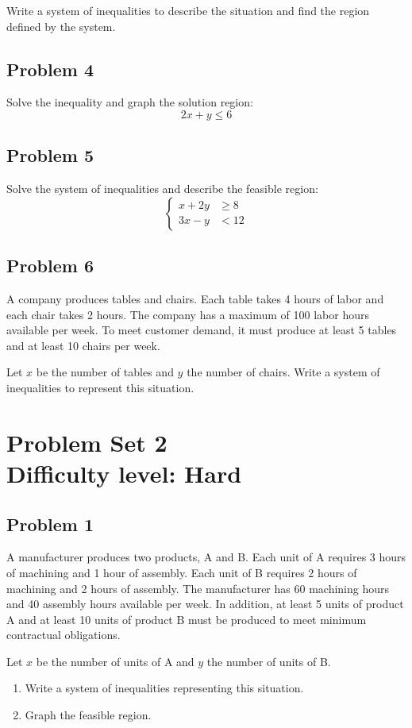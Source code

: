 \documentclass[12pt]{article}
\begin{document}
Write a system of inequalities to describe the situation and find the region defined by the system.

\subsection*{Problem 4}
Solve the inequality and graph the solution region:
\[
2x + y \leq 6
\]

\subsection*{Problem 5}
Solve the system of inequalities and describe the feasible region:
\[
\left\{
\begin{aligned}
x + 2y &\geq 8 \\
3x - y &< 12
\end{aligned}
\right.
\]

\subsection*{Problem 6}
A company produces tables and chairs. Each table takes 4 hours of labor and each chair takes 2 hours. The company has a maximum of 100 labor hours available per week. To meet customer demand, it must produce at least 5 tables and at least 10 chairs per week.

Let \( x \) be the number of tables and \( y \) the number of chairs. Write a system of inequalities to represent this situation.

\section*{Problem Set 2\\Difficulty level: Hard}
\subsection*{Problem 1}
A manufacturer produces two products, A and B. Each unit of A requires 3 hours of machining and 1 hour of assembly. Each unit of B requires 2 hours of machining and 2 hours of assembly. The manufacturer has 60 machining hours and 40 assembly hours available per week. In addition, at least 5 units of product A and at least 10 units of product B must be produced to meet minimum contractual obligations.

Let \( x \) be the number of units of A and \( y \) the number of units of B.

\begin{enumerate}[label=\alph*)]
    \item Write a system of inequalities representing this situation.
    \item Graph the feasible region.
\end{enumerate}
\end{document}
